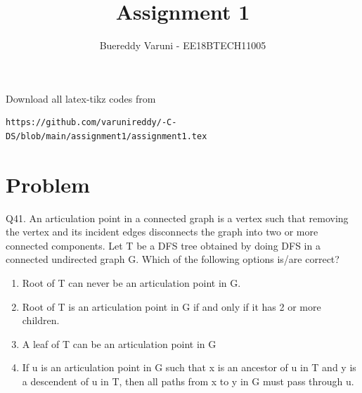 \documentclass[journal,12pt,twocolumn]{IEEEtran}
\begin{document}
     \def\rightbox#1{\makebox[0in][r]{#1}}
     \def\centbox#1{\makebox[0in]{#1}}
     \def\topbox#1{\raisebox{-\baselineskip}[0in][0in]{#1}}
     \def\midbox#1{\raisebox{-0.5\baselineskip}[0in][0in]{#1}}
\vspace{3cm}
\title{Assignment 1}
\author{Buereddy Varuni - EE18BTECH11005}
\maketitle
\newpage
\bigskip
\renewcommand{\thefigure}{\theenumi}
\renewcommand{\thetable}{\theenumi}
Download all latex-tikz codes from 
%
\begin{lstlisting}
https://github.com/varunireddy/-C-DS/blob/main/assignment1/assignment1.tex
\end{lstlisting}
\section{Problem}
Q41. An articulation point in a connected graph is a vertex such that removing the vertex and its incident edges disconnects the graph into two or more connected components.
Let T be a DFS tree obtained by doing DFS in a connected undirected graph G.
Which of the following options is/are correct?
\begin{enumerate}
    \item Root of T can never be an articulation point in G.
    \item Root of T is an articulation point in G if and only if it has 2 or more children.
    \item A leaf of T can be an articulation point in G
    \item If u is an articulation point in G such that x is an ancestor of u in T and y is a descendent of u in T, then all paths from x to y in G must pass through u.
\end{enumerate}
\end{document}
